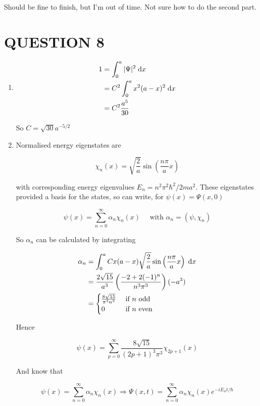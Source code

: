 \documentclass[a4paper]{article}
\begin{document}
Should be fine to finish, but I'm out of time. Not sure how to do the second part. 




\section{QUESTION 8}

\begin{enumerate}
	\item \begin{align*}
	1 & = \int_{0}^{a} | \Psi |^{2} \; \mathrm{d} x  \\
	& = C^{2} \int_{0}^{a} x^{2} (a-x)^{2} \; \mathrm{d} x\\
	& = C^{2} \frac{a^{5}}{30} 
	\end{align*}
	
	So $ C = \sqrt{30 } a^{-5/2} $
	
	\item Normalised energy eigenstates are 
	
	\[ \chi_{n}(x) = \sqrt{\frac{2}{a}} \sin \left(    \frac{n \pi}{a} x \right)  \]
	
	with corresponding energy eigenvalues $ E_{n} = n^{2} \pi^{2} \hbar^{2} / 2m a^{2} $. These eigenstates provided a basis for the states, so can write, for $ \psi(x) = \Psi(x,0) $
	
	\[ \psi(x) =  \sum_{n=0}^{\infty} \alpha_{n} \chi_{n}(x)  \quad \text{ with } \alpha_{n} = (\psi,\chi_{n}) \]
	
	So $ \alpha_{n} $ can be calculated by integrating
	
	\begin{align*}
	\alpha_{n} & = \int_{0}^{a} C x(a-x) \sqrt{\frac{2}{a}} \sin \left(    \frac{n \pi}{a} x \right) \; \mathrm{d} x \\
	& = \frac{2 \sqrt{15} }{a^{3}} \left(   \frac{-2 + 2(-1)^{n}}{n^{3}\pi^{3}} \right)(-a^{3}) \\
	& = \begin{cases} \frac{8 \sqrt{15}}{\pi^{3}n^{3}}  & \text{ if } n \text{ odd } \\ 0 & \text{ if } n \text{ even } \end{cases}
	\end{align*}
	
	Hence
	
	\[ \psi(x) =  \sum_{p=0}^{\infty} \frac{8 \sqrt{15}}{(2p+1)^{3}\pi^{3}} \chi_{2p + 1}(x)  \]
	
	And know that
	
	\[ \psi(x) =  \sum_{n=0}^{\infty} \alpha_{n} \chi_{n}(x) \Rightarrow \Psi(x,t) = \sum_{n=0}^{\infty} \alpha_{n} \chi_{n}(x) e^{- i E_{n} t / \hbar }  \]
	

\end{enumerate}
\end{document}
